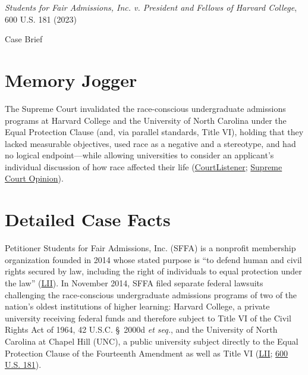 \documentclass[12pt]{article}
\begin{document}
\begin{center}
{\LARGE \textit{Students for Fair Admissions, Inc. v. President and Fellows of Harvard College}, 600 U.S. 181 (2023)\par}
\vspace{0.8em}
{\large Case Brief\par}
\end{center}
\vspace{1em}

\section{Memory Jogger}

The Supreme Court invalidated the race-conscious undergraduate admissions programs at Harvard College and the University of North Carolina under the Equal Protection Clause (and, via parallel standards, Title VI), holding that they lacked measurable objectives, used race as a negative and a stereotype, and had no logical endpoint---while allowing universities to consider an applicant's individual discussion of how race affected their life (\href{https://www.courtlistener.com/opinion/10049657/students-for-fair-admissions-inc-v-president-and-fellows-of-harvard/}{CourtListener}; \href{https://www.supremecourt.gov/opinions/22pdf/20-1199_hgdj.pdf}{Supreme Court Opinion}).

\section{Detailed Case Facts}

Petitioner Students for Fair Admissions, Inc. (SFFA) is a nonprofit membership organization founded in 2014 whose stated purpose is ``to defend human and civil rights secured by law, including the right of individuals to equal protection under the law'' (\href{https://www.law.cornell.edu/supremecourt/text/20-1199}{LII}). In November 2014, SFFA filed separate federal lawsuits challenging the race-conscious undergraduate admissions programs of two of the nation's oldest institutions of higher learning: Harvard College, a private university receiving federal funds and therefore subject to Title VI of the Civil Rights Act of 1964, 42 U.S.C. \S~2000d \textit{et seq.}, and the University of North Carolina at Chapel Hill (UNC), a public university subject directly to the Equal Protection Clause of the Fourteenth Amendment as well as Title VI (\href{https://www.law.cornell.edu/supremecourt/text/20-1199}{LII}; \href{https://www.supremecourt.gov/opinions/22pdf/600us1r53_4g15.pdf}{600 U.S. 181}).
\end{document}
